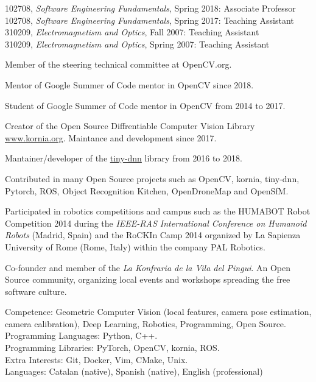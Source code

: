 \documentclass{article}
\begin{document}
\begin{llist}
\label{Teaching Experience}

102708, {\em Software Engineering Fundamentals}, Spring 2018: Associate Professor\\

102708, {\em Software Engineering Fundamentals}, Spring 2017: Teaching Assistant\\

310209, {\em Electromagnetism and Optics}, Fall 2007: Teaching Assistant\\
310209, {\em Electromagnetism and Optics}, Spring 2007: Teaching Assistant

\vspace{-0.4cm}

Member of the steering technical committee at OpenCV.org.

Mentor of Google Summer of Code mentor in OpenCV since 2018.

Student of Google Summer of Code mentor in OpenCV from 2014 to 2017.

Creator of the Open Source Diffrentiable Computer Vision Library \href{www.kornia.org}{www.kornia.org}. Maintance and development since 2017.

Mantainer/developer of the \href{http://tiny-dnn.readthedocs.io}{tiny-dnn} library from 2016 to 2018.

Contributed in many Open Source projects such as OpenCV, kornia, tiny-dnn, Pytorch, ROS, Object Recognition Kitchen, OpenDroneMap and OpenSfM.

Participated in robotics competitions and campus such as the HUMABOT Robot Competition 2014 during the \textit{IEEE-RAS International Conference on Humanoid Robots} (Madrid, Spain) and the RoCKIn Camp 2014 organized by  La Sapienza University of Rome (Rome, Italy) within the company PAL Robotics.

Co-founder and member of the \textit{La Konfraria de la Vila del Pingui}. An Open Source community, organizing local events and workshops spreading the free software culture.


\label{Skills}
Competence: Geometric Computer Vision (local features, camera pose estimation, camera calibration), Deep Learning, Robotics, Programming, Open Source.\\
Programming Languages: Python, C++.\\
Programming Libraries: PyTorch, OpenCV, kornia, ROS. \\
Extra Interests: Git, Docker, Vim, CMake, Unix. \\
Languages: Catalan (native), Spanish (native), English  (professional)



\end{llist}
\end{document}
